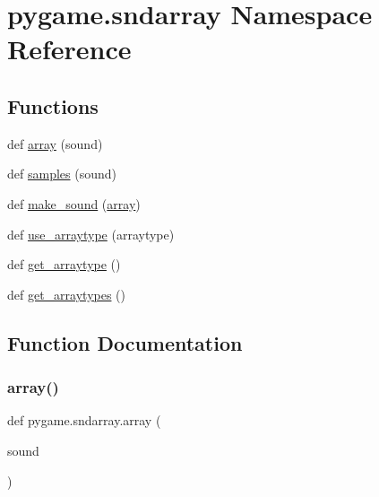 \hypertarget{namespacepygame_1_1sndarray}{}\section{pygame.\+sndarray Namespace Reference}
\label{namespacepygame_1_1sndarray}
\subsection*{Functions}
\begin{DoxyCompactItemize}
\item 
def \hyperlink{namespacepygame_1_1sndarray_a55934ecb8dff624d08c51f81dfcacc33}{array} (sound)
\item 
def \hyperlink{namespacepygame_1_1sndarray_a5e83514c733600fcd28b5272d08e3caf}{samples} (sound)
\item 
def \hyperlink{namespacepygame_1_1sndarray_af5dcb27cb21e18d062c67cc6b76c8153}{make\+\_\+sound} (\hyperlink{namespacepygame_1_1sndarray_a55934ecb8dff624d08c51f81dfcacc33}{array})
\item 
def \hyperlink{namespacepygame_1_1sndarray_aa4ea420eae3d540ff373d0903c2559e0}{use\+\_\+arraytype} (arraytype)
\item 
def \hyperlink{namespacepygame_1_1sndarray_aef82d5b7b0affb3a556abc4a93a276f9}{get\+\_\+arraytype} ()
\item 
def \hyperlink{namespacepygame_1_1sndarray_a42fcfe0e6707784803293ac1a5e315c8}{get\+\_\+arraytypes} ()
\end{DoxyCompactItemize}


\subsection{Function Documentation}
\mbox{\label{namespacepygame_1_1sndarray_a55934ecb8dff624d08c51f81dfcacc33}} 
\subsubsection{\texorpdfstring{array()}{array()}}
{\footnotesize\ttfamily def pygame.\+sndarray.\+array (\begin{DoxyParamCaption}\item[{}]{sound }\end{DoxyParamCaption})}

